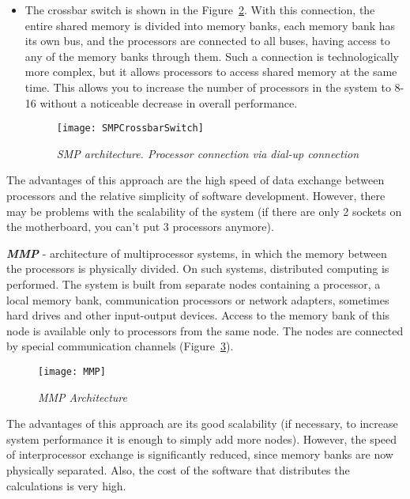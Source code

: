 {\begin{itemize}
\begin{figure}[H]
					\caption{\textit{SMP architecture. Processor connection via system bus}}
					\label{SMPSystemBus:image}
				\end{figure}
			\item The crossbar switch is shown in the Figure~\ref{SMPCrossbarSwitch:image}. With this connection, the entire shared memory is divided into memory banks, each memory bank has its own bus, and the processors are connected to all buses, having access to any of the memory banks through them. Such a connection is technologically more complex, but it allows processors to access shared memory at the same time. This allows you to increase the number of processors in the system to 8-16 without a noticeable decrease in overall performance.
				\begin{figure}[H]
					\texttt{[image: SMPCrossbarSwitch]}
					\caption{\textit{SMP architecture. Processor connection via dial-up connection}}
					\label{SMPCrossbarSwitch:image}
				\end{figure}
		\end{itemize}
	\par The advantages of this approach are the high speed of data exchange between processors and the relative simplicity of software development. However, there may be problems with the scalability of the system (if there are only 2 sockets on the motherboard, you can’t put 3 processors anymore).
	\par\textbf{\textit{MMP}} - architecture of multiprocessor systems, in which the memory between the processors is physically divided. On such systems, distributed computing is performed. The system is built from separate nodes containing a processor, a local memory bank, communication processors or network adapters, sometimes hard drives and other input-output devices. Access to the memory bank of this node is available only to processors from the same node. The nodes are connected by special communication channels (Figure~\ref{MMP:image}).
		\begin{figure}[H]
			\texttt{[image: MMP]}
			\caption{\textit{MMP Architecture}}
			\label{MMP:image}
		\end{figure}
	\par The advantages of this approach are its good scalability (if necessary, to increase system performance it is enough to simply add more nodes). However, the speed of interprocessor exchange is significantly reduced, since memory banks are now physically separated. Also, the cost of the software that distributes the calculations is very high.
	\par
}